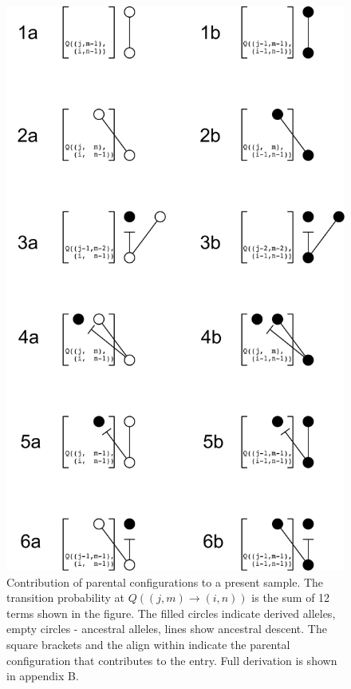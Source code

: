 \documentclass[review]{elsarticle}
\newcommand{\ra}{\rightarrow}
\begin{document}
\begin{figure}
  \centering
  \includegraphics[height=0.7\textheight]{fig/recurrence.pdf}
  \caption{Contribution of parental configurations to a present sample. The transition probability
    at $Q((j,m)\ra(i,n))$ is the sum of 12 terms shown in the figure. The filled circles indicate
    derived alleles, empty circles - ancestral alleles, lines show ancestral descent. The square
    brackets and the align within indicate the parental configuration that contributes to the
    entry. Full derivation is shown in appendix B.}
  \label{fig:recurrence}
\end{figure}
\end{document}
